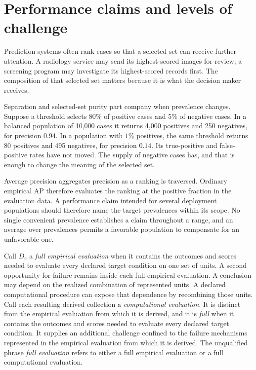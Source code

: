 \documentclass[11pt]{article}
\theoremstyle{remark}
\begin{document}
\section{Performance claims and levels of challenge}
\label{sec:introduction}

Prediction systems often rank cases so that a selected set can receive further
attention. A radiology service may send its highest-scored images for review;
a screening program may investigate its highest-scored records first. The
composition of that selected set matters because it is what the decision maker
receives.

Separation and selected-set purity part company when prevalence changes.
Suppose a threshold selects $80\%$ of positive cases and $5\%$ of negative
cases. In a balanced population of 10,000 cases it returns 4,000 positives and
250 negatives, for precision $0.94$. In a population with $1\%$ positives, the
same threshold returns 80 positives and 495 negatives, for precision $0.14$.
Its true-positive and false-positive rates have not moved. The supply of
negative cases has, and that is enough to change the meaning of the selected
set.

Average precision aggregates precision as a ranking is traversed. Ordinary
empirical AP therefore evaluates the ranking at the positive fraction in the
evaluation data. A performance claim intended for several deployment
populations should therefore name the target prevalences within its scope.
No single convenient prevalence establishes a claim throughout a range, and an
average over prevalences permits a favorable population to compensate for an
unfavorable one.

Call $D_e$ a \emph{full empirical evaluation} when it contains the outcomes and
scores needed to evaluate every declared target condition on one set of units.
A second opportunity for failure remains inside each full empirical
evaluation. A conclusion may depend on the realized combination of represented
units. A declared computational procedure can expose that dependence by recombining
those units. Call each resulting derived collection a \emph{computational
evaluation}. It is distinct from the empirical evaluation from which it is
derived, and it is \emph{full} when it contains the outcomes and scores needed
to evaluate every declared target condition. It supplies an additional
challenge confined to the failure mechanisms represented in the empirical
evaluation from which it is derived. The unqualified phrase \emph{full
evaluation} refers to either a full empirical evaluation or a full
computational evaluation.
\end{document}
